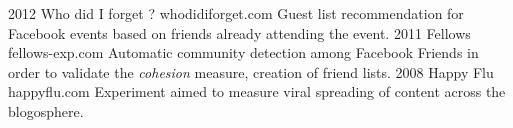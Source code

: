 \documentclass{cv}
\begin{document}
\begin{entrylist}
  \entry
    {2012}
    {Who did I forget ?}
    {whodidiforget.com}
    {Guest list recommendation for Facebook events based on friends already attending the event.}
  \entry
    {2011}
    {Fellows}
    {fellows-exp.com}
    {Automatic community detection among Facebook Friends in order to validate the \emph{cohesion} measure, creation of friend lists.}
  \entry
    {2008}
    {Happy Flu}
    {happyflu.com}
    {Experiment aimed to measure viral spreading of content across the blogosphere.}
\end{entrylist}
\end{document}
